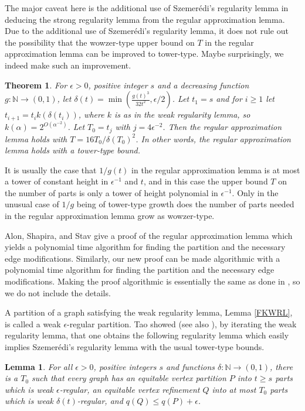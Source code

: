 \documentclass[11pt]{article}
\newtheorem{theorem}{Theorem}[section]
\newtheorem{lemma}{Lemma}[section]
\begin{document}
The major caveat here is the additional use of Szemer\'edi's regularity lemma
in deducing the strong regularity lemma from the regular approximation lemma.
Due to the additional use of Szemer\'edi's regularity lemma, it does not rule
out the possibility that the wowzer-type upper bound on $T$ in the regular
approximation lemma can be improved to tower-type. Maybe surprisingly, we
indeed make such an improvement.

\begin{theorem}\label{lsnewbound}
For $\epsilon>0$, positive integer $s$ and a decreasing function $g:\mathbb{N} \rightarrow (0,1)$, let $\delta(t)=\min(\frac{g(t)^3}{32t^2},\epsilon/2)$. Let $t_1=s$ and for
$i\geq 1$ let $t_{i+1}=t_ik(\delta(t_i))$, where $k$ is as in the weak
regularity lemma, so $k(\alpha)=2^{O(\alpha^{-2})}$. Let $T_0=t_j$ with
$j=4\epsilon^{-2}$. Then the regular approximation lemma holds with
$T=16T_0/\delta(T_0)^2$.  In other words, the regular approximation lemma holds
with a tower-type bound.
\end{theorem}

It is usually the case that $1/g(t)$ in the regular approximation lemma is at
most a tower of constant height in $\epsilon^{-1}$ and $t$, and in this case
the upper bound $T$ on the number of parts is only a tower of height polynomial
in $\epsilon^{-1}$. Only in the unusual case of $1/g$ being of tower-type
growth does the number of parts needed in the regular approximation lemma grow
as wowzer-type.

Alon, Shapira, and Stav \cite{AlShSt} give a proof of the regular approximation
lemma which yields a polynomial time algorithm for finding the partition and
the necessary edge modifications. Similarly, our new proof
can be made algorithmic with  a polynomial time algorithm for finding the
partition and the necessary edge modifications. Making the proof algorithmic is
essentially the same as done in \cite{AlShSt}, so we do not include the
details.

A partition of a graph satisfying the weak regularity lemma, Lemma \ref{FKWRL},
is called a weak $\epsilon$-regular partition. Tao showed \cite{Ta1} (see also
\cite{RoSc}), by iterating the weak regularity lemma, that one obtains the
following regularity lemma which easily implies Szemer\'edi's regularity lemma
with the usual tower-type bounds.

\begin{lemma}\label{Taoregularity}
For all $\epsilon>0$, positive integers $s$ and functions $\delta: \mathbb{N} \rightarrow (0,1)$,
there is a $T_0$ such that every graph has an equitable vertex partition $P$
into $t \geq s$ parts which is weak $\epsilon$-regular, an equitable vertex refinement
$Q$ into at most $T_0$ parts which is weak $\delta(t)$-regular, and $q(Q) \leq
q(P)+\epsilon$.
\end{lemma}
\end{document}
